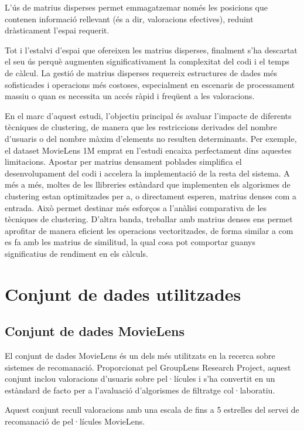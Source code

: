 \documentclass[a4paper,12pt]{report}
\begin{document}
L’ús de matrius disperses permet emmagatzemar només les posicions que contenen informació rellevant (és a dir, valoracions efectives), reduint dràsticament l’espai requerit.

Tot i l’estalvi d’espai que ofereixen les matrius disperses, finalment s’ha descartat el seu ús perquè augmenten significativament la complexitat del codi i el temps de càlcul. La gestió de matrius disperses requereix estructures de dades més sofisticades i operacions més costoses, especialment en escenaris de processament massiu o quan es necessita un accés ràpid i freqüent a les valoracions.

En el marc d’aquest estudi, l’objectiu principal és avaluar l’impacte de diferents tècniques de clustering, de manera que les restriccions derivades del nombre d’usuaris o del nombre màxim d’elements no resulten determinants. Per exemple, el dataset MovieLens 1M emprat en l’estudi encaixa perfectament dins aquestes limitacions. Apostar per matrius densament poblades simplifica el desenvolupament del codi i accelera la implementació de la resta del sistema. A més a més, moltes de les llibreries estàndard que implementen els algorismes de clustering estan optimitzades per a, o directament esperen, matrius denses com a entrada. Això permet destinar més esforços a l’anàlisi comparativa de les tècniques de clustering. D'altra banda, treballar amb matrius denses ens permet aprofitar de manera eficient les operacions vectoritzades, de forma similar a com es fa amb les matrius de similitud, la qual cosa pot comportar guanys significatius de rendiment en els càlculs.

\section{Conjunt de dades utilitzades}

\subsection{Conjunt de dades MovieLens} 

El conjunt de dades MovieLens \cite{harper2015movielens} és un dels més utilitzats en la recerca sobre sistemes de recomanació. Proporcionat pel GroupLens Research Project, aquest conjunt inclou valoracions d’usuaris sobre pel·lícules i s’ha convertit en un estàndard de facto per a l’avaluació d’algorismes de filtratge col·laboratiu.

Aquest conjunt recull valoracions amb una escala de fins a 5 estrelles del servei de recomanació de pel·lícules MovieLens.
\end{document}

